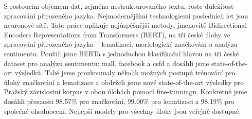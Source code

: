 \documentclass[]{article}
\begin{document}
S rostoucím objemem dat, zejména nestrukturovaného textu, roste důležitost zpracování přirozeného jazyka. Nejmodernějšími technologiemi posledních let jsou neuronové sítě. Tato práce aplikuje nejúspěšnější metody, jmenovitě Bidirectional Encoders Representations from Transformers (BERT), na tři české úlohy ve zpracování přirozeného jazyka -- lematizaci, morfologické značkování a analýzu sentimentu. Použili jsme BERTa s jednoduchou klasifikační hlavou na tři české dataset pro analýzu sentimentu: mall, facebook a csfd a dosáhli jsme state-of-the-art výsledků. Také jsme prozkoumaly několik možných postupů trénování pro úlohy značkování a lematizace a obdrželi jsme nové state-of-the-art výsledky pro Pražský závislostní korpus v obou úlohách pomocí fine-tunningu. Konkrétně jsme dosáhli přesnosti 98.57\% pro značkování, 99.00\% pro lematizaci a 98.19\%  pro společné ohodnocení. Nejlepší modely pro všechny úlohy jsou veřejně dostupné.
\end{document}
